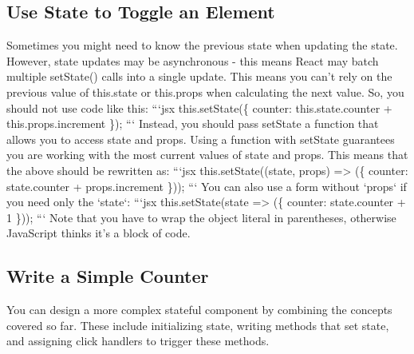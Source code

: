 \documentclass{article}%
\begin{document}
%
\subsection{Use State to Toggle an Element}%
\label{subsec:UseStatetoToggleanElement}%
Sometimes you might need to know the previous state when updating the state. However, state updates may be asynchronous {-} this means React may batch multiple setState() calls into a single update. This means you can't rely on the previous value of this.state or this.props when calculating the next value. So, you should not use code like this:\newline%
```jsx\newline%
this.setState(\{\newline%
  counter: this.state.counter + this.props.increment\newline%
\});\newline%
```\newline%
Instead, you should pass setState a function that allows you to access state and props. Using a function with setState guarantees you are working with the most current values of state and props. This means that the above should be rewritten as:\newline%
```jsx\newline%
this.setState((state, props) => (\{\newline%
  counter: state.counter + props.increment\newline%
\}));\newline%
```\newline%
You can also use a form without `props` if you need only the `state`:\newline%
```jsx\newline%
this.setState(state => (\{\newline%
  counter: state.counter + 1\newline%
\}));\newline%
```\newline%
Note that you have to wrap the object literal in parentheses, otherwise JavaScript thinks it's a block of code.\newline%

%
\subsection{Write a Simple Counter}%
\label{subsec:WriteaSimpleCounter}%
You can design a more complex stateful component by combining the concepts covered so far. These include initializing state, writing methods that set state, and assigning click handlers to trigger these methods.\newline%
\end{document}
